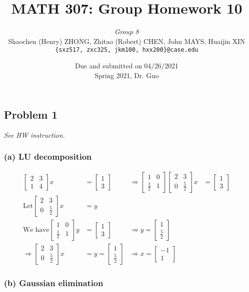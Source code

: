 \documentclass[11pt]{article}
\newcommand{\ilc}{\texttt}
\providecommand{\qbm}[1]{\begin{bmatrix} #1 \end{bmatrix}}
\begin{document}
\title{\textbf{MATH 307: Group Homework 10}}


\author{\textit{Group 8}\\
Shaochen (Henry) ZHONG, Zhitao (Robert) CHEN, John MAYS, Huaijin XIN\\ \ilc{\{sxz517, zxc325, jkm100, hxx200\}@case.edu}}

\date{Due and submitted on 04/26/2021 \\ Spring 2021, Dr. Guo}
\maketitle



\subsection*{Problem 1}
\textit{See HW instruction.}\newline

\subsubsection*{(a) LU decomposition}

\begin{align*}
\qbm{2 & 3 \\ 1 & 4} x &= \qbm{1 \\ 3} & \Rightarrow \qbm{1 & 0 \\ \frac{1}{2} & 1} \qbm{2 & 3 \\ 0 & \frac{5}{2}} x &= \qbm{1 \\ 3} \\
\text{Let} \qbm{2 & 3 \\ 0 & \frac{5}{2}} x &= y \\
\text{We have} \qbm{1 & 0 \\ \frac{1}{2} & 1}  y &= \qbm{1 \\ 3} & \Rightarrow y = \qbm{1 \\ \frac{5}{2}} \\
\Longrightarrow \qbm{2 & 3 \\ 0 & \frac{5}{2}} x &= y = \qbm{1 \\ \frac{5}{2}} & \Rightarrow x = \qbm{-1 \\ 1}
\end{align*}

\subsubsection*{(b) Gaussian elimination}
\end{document}
